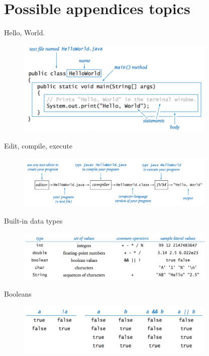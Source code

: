 \section*{Possible appendices topics}

Hello, World.

\begin{figure}[h]
	\centering
	\includegraphics[width=0.85\textwidth]{images/hello_world_description}
	\label{fig:hello_world_description}
\end{figure}

Edit, compile, execute

\begin{figure}[h]
	\centering
	\includegraphics[width=0.85\textwidth]{images/edit_compile_execute}
	\label{fig:edit_compile_execute}
\end{figure}

Built-in data types

\begin{figure}[h]
	\centering
	\includegraphics[width=0.85\textwidth]{images/data_types}
	\label{fig:data_types}
\end{figure}

Booleans

\begin{figure}[h]
	\centering
	\includegraphics[width=0.85\textwidth]{images/booleans}
	\label{fig:booleans}
\end{figure}

